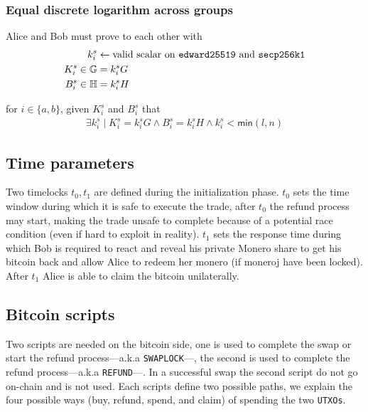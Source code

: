 \documentclass{llncs}
\newcommand{\GG}{\mathbb{G}}
\newcommand{\HH}{\mathbb{H}}
\begin{document}
\subsubsection{Equal discrete logarithm across groups}
Alice and Bob must prove to each other with
\begin{equation}
\begin{split}
    k^s_i &\leftarrow \text{valid scalar on \texttt{edward25519} and \texttt{secp256k1}} \\
    K^s_i \in \GG &= k^s_iG \\
    B^s_i \in \HH &= k^s_iH \\
\end{split}
\end{equation}

for $i \in \{a, b\}$, given $K^s_i$ and $B^s_i$ that
\begin{equation}
\begin{split}
    \exists k^s_i \mid K^s_i = k^s_iG \land B^s_i = k^s_iH \land k^s_i < \textsf{min}(l,n)
\end{split}
\end{equation}

\subsection{Time parameters}
Two timelocks $t_0, t_1$ are defined during the initialization phase. $t_0$ sets the time window during which it is safe to execute the trade, after $t_0$ the refund process may start, making the trade unsafe to complete because of a potential race condition (even if hard to exploit in reality). $t_1$ sets the response time during which Bob is required to react and reveal his private Monero share to get his bitcoin back and allow Alice to redeem her monero (if moneroj have been locked). After $t_1$ Alice is able to claim the bitcoin unilaterally.

\subsection{Bitcoin scripts}
Two scripts are needed on the bitcoin side, one is used to complete the swap or start the refund process---a.k.a \texttt{SWAPLOCK}---, the second is used to complete the refund process---a.k.a \texttt{REFUND}---. In a successful swap the second script do not go on-chain and is not used. Each scripts define two possible paths, we explain the four possible ways (buy, refund, spend, and claim) of spending the two \texttt{UTXOs}.
\end{document}
